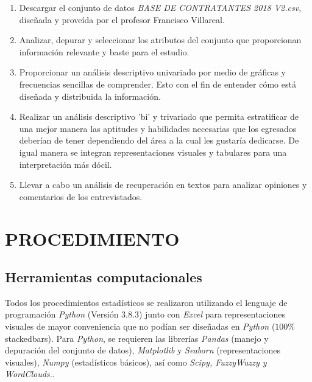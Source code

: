 \documentclass{article}
\begin{document}
\begin{enumerate}
    \item Descargar el conjunto de datos \textit{BASE DE CONTRATANTES 2018 V2.csv}, diseñada y proveída por el profesor Francisco Villareal. 
    
    \item Analizar, depurar y seleccionar los atributos del conjunto que proporcionan información relevante y baste para el estudio.
    
    \item Proporcionar un análisis descriptivo univariado por medio de gráficas y frecuencias sencillas de comprender. Esto con el fin de entender cómo está diseñada y distribuida la información.
    
    \item Realizar un análisis descriptivo 'bi' y trivariado que permita estratificar de una mejor manera las aptitudes y habilidades necesarias que los egresados deberían de tener dependiendo del área a la cual les gustaría dedicarse. De igual manera se integran representaciones visuales y tabulares para una interpretación más dócil.
    
    \item Llevar a cabo un análisis de recuperación en textos para analizar opiniones y comentarios de los entrevistados. 
    
\end{enumerate}

\section{PROCEDIMIENTO}

\subsection{Herramientas computacionales}

Todos los procedimientos estadísticos se realizaron utilizando el lenguaje de programación \textit{Python} (Versión 3.8.3) junto con \textit{Excel} para representaciones visuales de mayor conveniencia que no podían ser diseñadas en \textit{Python} ($100\%$ stackedbars). Para \textit{Python}, se requieren las librerías \textit{Pandas} (manejo y depuración del conjunto de datos), \textit{Matplotlib} y \textit{Seaborn} (representaciones visuales), \textit{Numpy} (estadísticos básicos), así como \textit{Scipy, FuzzyWuzzy y WordClouds.}. \\
\end{document}
